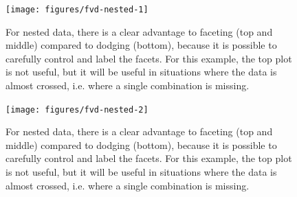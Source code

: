 \begin{Shaded}
\end{Shaded}

\begin{figure}
\texttt{[image: figures/fvd-nested-1]} \caption{For nested data, there is a clear advantage to faceting (top and middle) compared to dodging (bottom), because it is possible to carefully control and label the facets.  For this example, the top plot is not useful, but it will be useful in situations where the data is almost crossed, i.e. where a single combination is missing.\label{fig:fvd-nested1}}
\end{figure}

\begin{Shaded}
\begin{Highlighting}[]
  
\NormalTok{() +}\StringTok{  }
\StringTok{  }\StringTok{ } \NormalTok{, } \NormalTok{)}
\end{Highlighting}
\end{Shaded}

\begin{figure}
\texttt{[image: figures/fvd-nested-2]} \caption{For nested data, there is a clear advantage to faceting (top and middle) compared to dodging (bottom), because it is possible to carefully control and label the facets.  For this example, the top plot is not useful, but it will be useful in situations where the data is almost crossed, i.e. where a single combination is missing.\label{fig:fvd-nested2}}
\end{figure}

